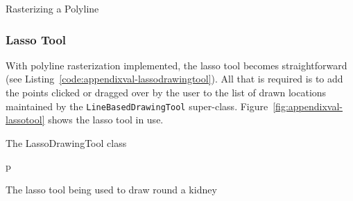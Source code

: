 \begin{stulisting}[p]
\caption{Rasterizing a Polyline}
\label{code:appendixval-rasterizepolyline}

\end{stulisting}

\subsubsection{Lasso Tool}

With polyline rasterization implemented, the lasso tool becomes straightforward (see Listing~\ref{code:appendixval-lassodrawingtool}). All that is required is to add the points clicked or dragged over by the user to the list of drawn locations maintained by the \texttt{LineBasedDrawingTool} super-class. Figure~\ref{fig:appendixval-lassotool} shows the lasso tool in use.

\begin{stulisting}[p]
\caption{The LassoDrawingTool class}
\label{code:appendixval-lassodrawingtool}

\end{stulisting}

\begin{stusubfig}{p}
	\hspace{4mm}%
\caption{The lasso tool being used to draw round a kidney}
\label{fig:appendixval-lassotool}
\end{stusubfig}

